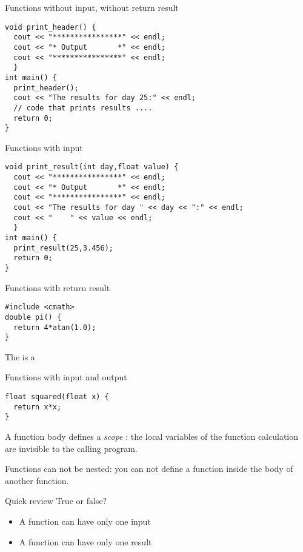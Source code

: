 \begin{block}{Functions without input, without return result}
  \label{sl:func-ex1}
\begin{verbatim}
void print_header() {
  cout << "****************" << endl;
  cout << "* Output       *" << endl;
  cout << "****************" << endl;
  }
int main() {
  print_header();
  cout << "The results for day 25:" << endl;
  // code that prints results ....
  return 0;
}
\end{verbatim}
\end{block}

\begin{block}{Functions with input}
  \label{sl:func-ex2}
\begin{verbatim}
void print_result(int day,float value) {
  cout << "****************" << endl;
  cout << "* Output       *" << endl;
  cout << "****************" << endl;
  cout << "The results for day " << day << ":" << endl;
  cout << "    " << value << endl;
  }
int main() {
  print_result(25,3.456);
  return 0;
}
\end{verbatim}
\end{block}

\begin{block}{Functions with return result}
  \label{sl:func-return}
\begin{verbatim}
#include <cmath>
double pi() {
  return 4*atan(1.0);
}
\end{verbatim}
The  is a 
\end{block}

\begin{block}{Functions with input and output}
  \label{sl:func-param-return}
\begin{verbatim}
float squared(float x) {
  return x*x;
}
\end{verbatim}
\end{block}

A function body defines a
%
\emph{scope}%
:
the local variables of the function calculation are invisible to the
calling program.

Functions can not be nested: you can not define a function inside the
body of another function.

\begin{exercise}{Quick review}
  \label{rev:func-param}
  True or false?
  \begin{itemize}
  \item A function can have only one input
  \item A function can have only one result
  \end{itemize}
\end{exercise}

